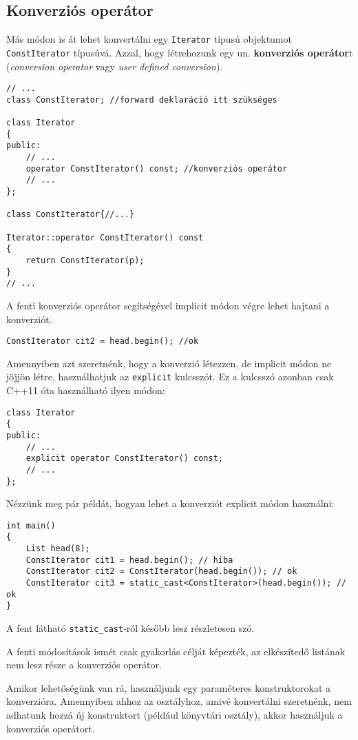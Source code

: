 \documentclass[../cpp_book/cpp_book.tex]{subfiles}
\begin{document}
	\subsection{Konverziós operátor}
	Más módon is át lehet konvertálni egy \texttt{Iterator} típusú objektumot \texttt{ConstIterator} típusúvá. Azzal, hogy létrehozunk egy un. \textbf{konverziós operátor}t (\textit{conversion operator} vagy \textit{user defined conversion}). 
	\begin{lstlisting}
// ...
class ConstIterator; //forward deklaráció itt szükséges

class Iterator
{
public:
	// ...
	operator ConstIterator() const; //konverziós operátor
	// ...
};

class ConstIterator{//...}

Iterator::operator ConstIterator() const
{
	return ConstIterator(p);
}
// ...
	\end{lstlisting}
	A fenti konverziós operátor segítségével implicit módon végre lehet hajtani a konverziót. 
	\begin{lstlisting}
ConstIterator cit2 = head.begin(); //ok
	\end{lstlisting}	
	Amennyiben azt szeretnénk, hogy a konverzió létezzen, de implicit módon ne jöjjön létre, használhatjuk az \texttt{explicit} kulcsszót. Ez a kulcsszó azonban csak C++11 óta használható ilyen módon:
	\begin{lstlisting}
class Iterator
{
public:
	// ...
	explicit operator ConstIterator() const;
	// ...
};
	\end{lstlisting}
	Nézzünk meg pár példát, hogyan lehet a konverziót explicit módon használni:
	\begin{lstlisting}
int main()
{
	List head(8);
	ConstIterator cit1 = head.begin(); // hiba
	ConstIterator cit2 = ConstIterator(head.begin()); // ok
	ConstIterator cit3 = static_cast<ConstIterator>(head.begin()); // ok
}
	\end{lstlisting}
	\begin{note}
		A fent látható \texttt{static\_cast}-ról később lesz részletesen szó.
	\end{note}
	\begin{note}
		A fenti módosítások ismét csak gyakorlás célját képezték, az elkészítedő listának nem lesz része a konverziós operátor.
	\end{note}
	\begin{note}
    Amikor lehetőségünk van rá, használjunk egy paraméteres konstruktorokat a konverzióra. Amennyiben ahhoz az osztályhoz, amivé konvertálni szeretnénk, nem adhatunk hozzá új konstruktort (például könyvtári osztály), akkor használjuk a konverziós operátort. 
	\end{note}
\end{document}
